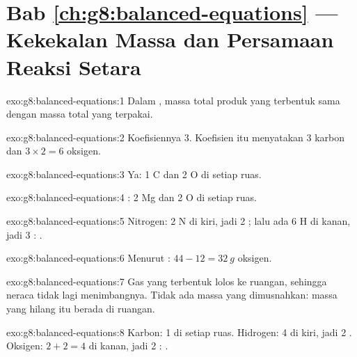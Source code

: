 \section*{Bab \ref{ch:g8:balanced-equations} --- Kekekalan Massa dan Persamaan Reaksi Setara}

\begin{solution}{exo:g8:balanced-equations:1}
Dalam , massa total produk yang terbentuk sama dengan massa
total  yang terpakai.
\end{solution}

\begin{solution}{exo:g8:balanced-equations:2}
Koefisiennya 3. Koefisien itu menyatakan 3  karbon dan
$3 \times 2 = 6$  oksigen.
\end{solution}

\begin{solution}{exo:g8:balanced-equations:3}
Ya: 1 C dan 2 O di setiap ruas.
\end{solution}

\begin{solution}{exo:g8:balanced-equations:4}
: 2 Mg dan 2 O di setiap ruas.
\end{solution}

\begin{solution}{exo:g8:balanced-equations:5}
Nitrogen: 2 N di kiri, jadi 2 ; lalu ada 6 H di kanan, jadi 3
: .
\end{solution}

\begin{solution}{exo:g8:balanced-equations:6}
Menurut : $44 - 12 = \qty{32}{g}$ oksigen.
\end{solution}

\begin{solution}{exo:g8:balanced-equations:7}
Gas yang terbentuk lolos ke ruangan, sehingga neraca tidak lagi
menimbangnya. Tidak ada massa yang dimusnahkan: massa yang hilang itu
berada di  ruangan.
\end{solution}

\begin{solution}{exo:g8:balanced-equations:8}
Karbon: 1 di setiap ruas. Hidrogen: 4 di kiri, jadi 2 . Oksigen:
$2 + 2 = 4$ di kanan, jadi 2 :
.
\end{solution}

